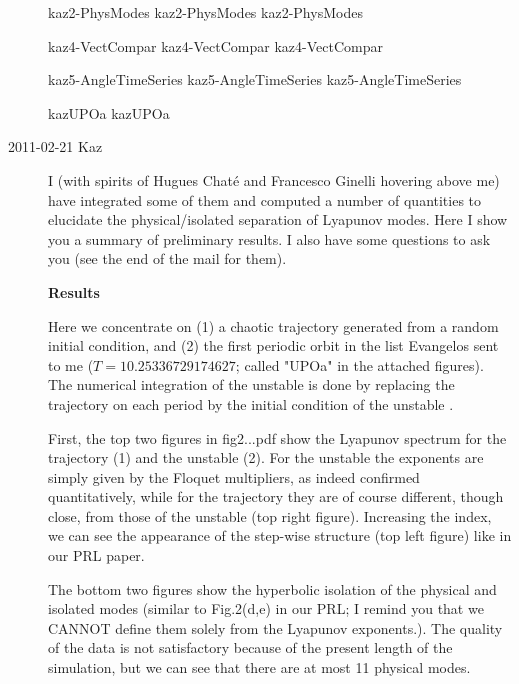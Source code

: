 \begin{description}
{kaz2-PhysModes}   %
{}   %
{    %
kaz2-PhysModes
}
{kaz2-PhysModes}   %

{kaz4-VectCompar}   %
{}   %
{    %
kaz4-VectCompar
}
{kaz4-VectCompar}   %

{kaz5-AngleTimeSeries}   %
{}   %
{    %
kaz5-AngleTimeSeries
}
{kaz5-AngleTimeSeries}   %

{}   %
{    %
kazUPOa
}
{kazUPOa}   %

\item[2011-02-21 Kaz]
I (with spirits of Hugues Chat\'e and Francesco Ginelli hovering above me)
have integrated some of
them and computed a number of quantities to elucidate the
physical/isolated separation of Lyapunov modes. Here I show you a
summary of preliminary results. I also have some questions to ask you
(see the end of the mail for them).


\textbf{Results}

Here we concentrate on (1) a chaotic trajectory generated from a random
initial condition, and (2) the first periodic orbit in the list
Evangelos sent to me ($T=10.25336729174627$; called "UPOa" in the attached
figures). The numerical integration of the {unstable \po} is done by replacing the
trajectory on each period by the initial condition of the {unstable \po}.

First, the top two figures in fig2...pdf show the Lyapunov spectrum for
the trajectory (1) and the {unstable \po} (2). For the {unstable \po} the exponents are simply
given by the Floquet multipliers, as indeed confirmed quantitatively,
while for the trajectory they are of course different, though close,
from those of the {unstable \po} (top right figure). Increasing the index, we can
see the appearance of the step-wise structure (top left figure) like in
our PRL paper.

The bottom two figures show the hyperbolic isolation of the physical and
isolated modes (similar to Fig.2(d,e) in our PRL; I remind you that we
CANNOT define them solely from the Lyapunov exponents.). The quality of
the data is not satisfactory because of the present length of the
simulation, but we can see that there are at most 11 physical modes.



\end{description}
